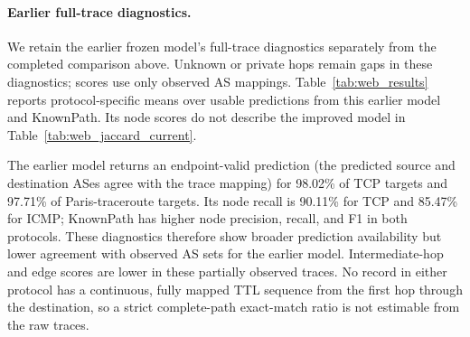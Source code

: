 
\paragraph{Earlier full-trace diagnostics.}
We retain the earlier frozen model's full-trace diagnostics separately from
the completed comparison above. Unknown or private hops remain gaps in these
diagnostics; scores use only observed AS mappings. Table~\ref{tab:web_results}
reports protocol-specific means over usable predictions from this earlier
model and KnownPath. Its node scores do not describe the improved model in
Table~\ref{tab:web_jaccard_current}.

\begin{table}[t!]
\centering
\caption{Earlier frozen-model diagnostics against AS-level traceroute observations. Percentages are means over usable predictions; ``Avail.'' counts returned predictions. These are separate from the improved model's results in Table~\ref{tab:web_jaccard_current}.}
\label{tab:web_results}
\footnotesize
\renewcommand{\arraystretch}{1.1}
\setlength{\tabcolsep}{2.4pt}
\end{table}

The earlier model returns an endpoint-valid prediction (the predicted source and destination ASes agree with the trace mapping) for 98.02\% of TCP targets and 97.71\% of Paris-traceroute targets. Its node recall is 90.11\% for TCP and 85.47\% for ICMP; KnownPath has higher node precision, recall, and F1 in both protocols. These diagnostics therefore show broader prediction availability but lower agreement with observed AS sets for the earlier model. Intermediate-hop and edge scores are lower in these partially observed traces. No record in either protocol has a continuous, fully mapped TTL sequence from the first hop through the destination, so a strict complete-path exact-match ratio is not estimable from the raw traces.

